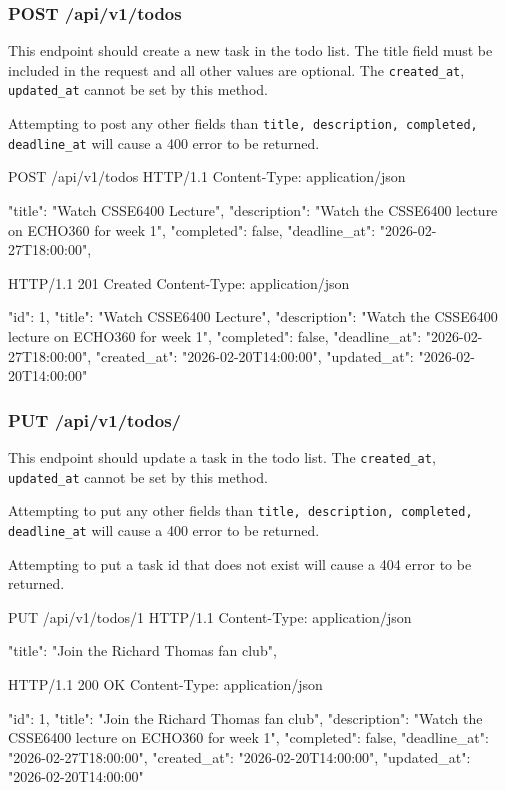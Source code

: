 \documentclass{csse4400}
\begin{document}
\subsubsection{POST /api/v1/todos}
This endpoint should create a new task in the todo list.
The title field must be included in the request and all other values are optional.
The \texttt{created\_at}, \texttt{updated\_at} cannot be set by this method.

Attempting to post any other fields than \texttt{title, description, completed, deadline\_at} will cause a 400 error to be returned.

\begin{code}[language=json,numbers=none]{}
POST /api/v1/todos HTTP/1.1
Content-Type: application/json

{
    "title": "Watch CSSE6400 Lecture",
    "description": "Watch the CSSE6400 lecture on ECHO360 for week 1",
    "completed": false,
    "deadline_at": "2026-02-27T18:00:00",
}
\end{code}
\begin{code}[language=json,numbers=none]{}
HTTP/1.1 201 Created
Content-Type: application/json

{
    "id": 1,
    "title": "Watch CSSE6400 Lecture",
    "description": "Watch the CSSE6400 lecture on ECHO360 for week 1",
    "completed": false,
    "deadline_at": "2026-02-27T18:00:00",
    "created_at": "2026-02-20T14:00:00",
    "updated_at": "2026-02-20T14:00:00"
}
\end{code}

\subsubsection{PUT /api/v1/todos/}
This endpoint should update a task in the todo list. The \texttt{created\_at}, \texttt{updated\_at} cannot be set by this method.

Attempting to put any other fields than \texttt{title, description, completed, deadline\_at} will cause a 400 error to be returned.

Attempting to put a task id that does not exist will cause a 404 error to be returned.

\begin{code}[language=json,numbers=none]{}
PUT /api/v1/todos/1 HTTP/1.1
Content-Type: application/json

{
    "title": "Join the Richard Thomas fan club",
}
\end{code}

\begin{code}[language=json,numbers=none]{}
HTTP/1.1 200 OK
Content-Type: application/json

{
    "id": 1,
    "title": "Join the Richard Thomas fan club",
    "description": "Watch the CSSE6400 lecture on ECHO360 for week 1",
    "completed": false,
    "deadline_at": "2026-02-27T18:00:00",
    "created_at": "2026-02-20T14:00:00",
    "updated_at": "2026-02-20T14:00:00"
}
\end{code}
\end{document}
